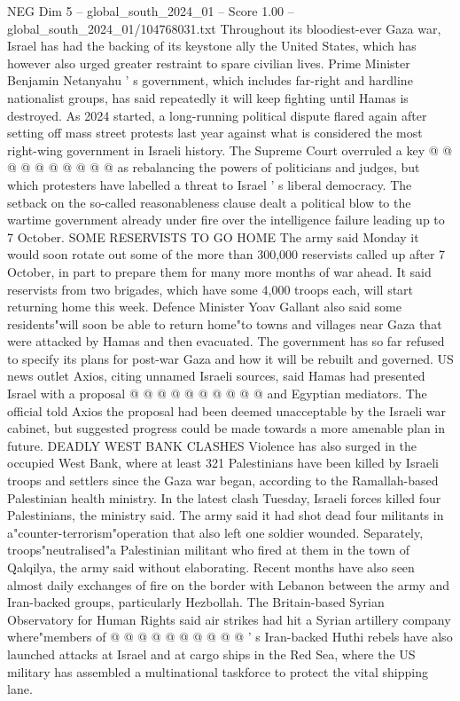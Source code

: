 \begin{textsample}{NEG Dim 5 – global\_south\_2024\_01 – Score 1.00 – global\_south\_2024\_01/104768031.txt}
Throughout its bloodiest-ever Gaza war, Israel has had the backing of its keystone ally the United States, which has however also urged greater restraint to spare civilian lives.
Prime Minister Benjamin Netanyahu ' s government, which includes far-right and hardline nationalist groups, has said repeatedly it will keep fighting until Hamas is destroyed.
As 2024 started, a long-running political dispute flared again after setting off mass street protests last year against what is considered the most right-wing government in Israeli history.
The Supreme Court overruled a key @ @ @ @ @ @ @ @ @ @ as rebalancing the powers of politicians and judges, but which protesters have labelled a threat to Israel ' s liberal democracy.
The setback on the so-called reasonableness clause dealt a political blow to the wartime government already under fire over the intelligence failure leading up to 7 October.
SOME RESERVISTS TO GO HOME The army said Monday it would soon rotate out some of the more than 300,000 reservists called up after 7 October, in part to prepare them for many more months of war ahead.
It said reservists from two brigades, which have some 4,000 troops each, will start returning home this week.
Defence Minister Yoav Gallant also said some residents"will soon be able to return home"to towns and villages near Gaza that were attacked by Hamas and then evacuated.
The government has so far refused to specify its plans for post-war Gaza and how it will be rebuilt and governed.
US news outlet Axios, citing unnamed Israeli sources, said Hamas had presented Israel with a proposal @ @ @ @ @ @ @ @ @ @ and Egyptian mediators.
The official told Axios the proposal had been deemed unacceptable by the Israeli war cabinet, but suggested progress could be made towards a more amenable plan in future.
DEADLY WEST BANK CLASHES Violence has also surged in the occupied West Bank, where at least 321 Palestinians have been killed by Israeli troops and settlers since the Gaza war began, according to the Ramallah-based Palestinian health ministry.
In the latest clash Tuesday, Israeli forces killed four Palestinians, the ministry said.
The army said it had shot dead four militants in a"counter-terrorism"operation that also left one soldier wounded.
Separately, troops"neutralised"a Palestinian militant who fired at them in the town of Qalqilya, the army said without elaborating.
Recent months have also seen almost daily exchanges of fire on the border with Lebanon between the army and Iran-backed groups, particularly Hezbollah.
The Britain-based Syrian Observatory for Human Rights said air strikes had hit a Syrian artillery company where"members of @ @ @ @ @ @ @ @ @ @ ' s Iran-backed Huthi rebels have also launched attacks at Israel and at cargo ships in the Red Sea, where the US military has assembled a multinational taskforce to protect the vital shipping lane.

\end{textsample}
